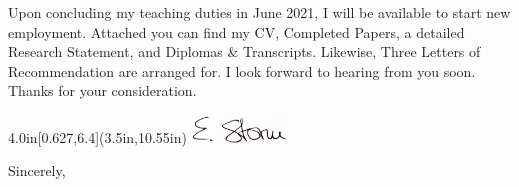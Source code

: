 \documentclass[12pt]{letter} %
\begin{document}
\begin{letter}

Upon concluding my teaching duties in June 2021, I will be available to start new employment. Attached you can find my CV, Completed Papers, a detailed Research Statement, and Diplomas \& Transcripts. Likewise, Three Letters of Recommendation are arranged for. I look forward to hearing from you soon. Thanks for your consideration. 



\begin{textblock*}{4.0in}[0.627,6.4](3.5in,10.55in) %
	\includegraphics[width=1in]{signature_dynamic2}
\end{textblock*}



\closing{Sincerely,} 

\clearpage






\end{letter}
\end{document}
